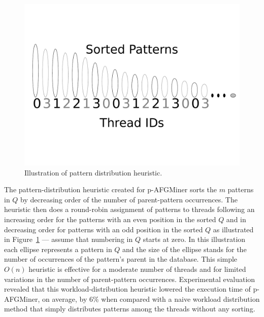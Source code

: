 \begin{figure}[h!]
\centering
    \includegraphics[scale=0.3]{figures/WorkDistributionHeuristic.pdf}
    \caption{Illustration of pattern distribution heuristic.}
    \label{fig:WorkDistributionHeuristic}  
\end{figure}

The pattern-distribution heuristic created for p-AFGMiner sorts the $m$ patterns in $Q$ by decreasing order of the number of parent-pattern occurrences. The heuristic then does a round-robin assignment of patterns to threads following an increasing order for the patterns with an even position in the sorted $Q$ and in decreasing order for patterns with an odd position in the sorted $Q$ as illustrated in Figure~\ref{fig:WorkDistributionHeuristic} --- assume that numbering in $Q$ starts at zero. In this illustration each ellipse represents a pattern in $Q$ and the size of the ellipse stands for the number of occurrences of the pattern's parent in the database.
This simple $O(n)$ heuristic is effective for a moderate number of threads and for limited variations in the number of parent-pattern occurrences. Experimental evaluation revealed that this workload-distribution heuristic lowered the execution time of p-AFGMiner, on average, by 6\% when compared with a naive workload distribution method that simply distributes patterns among the threads without any sorting.


 


 
